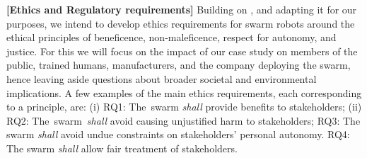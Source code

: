 \documentclass[runningheads]{llncs}
\begin{document}
\noindent \textbf{[Ethics and Regulatory requirements]}
\newline Building on \cite{Porter2022}, and adapting it for our purposes, we intend to develop ethics requirements for swarm robots around the ethical principles of beneficence, non-maleficence, respect for autonomy, and justice. For this we will focus on the impact of our case study on members of the public, trained humans, manufacturers, and the company deploying the swarm, hence leaving aside questions about broader societal and environmental implications. A few examples of the main ethics requirements, each corresponding to a principle, are: (i) RQ1: The swarm \emph{shall} provide benefits to stakeholders; (ii) RQ2: The swarm \emph{shall} avoid causing unjustified harm to stakeholders; RQ3: The swarm \emph{shall} avoid undue constraints on stakeholders' personal autonomy. RQ4: The swarm \emph{shall} allow fair treatment of stakeholders.  
%
\end{document}
